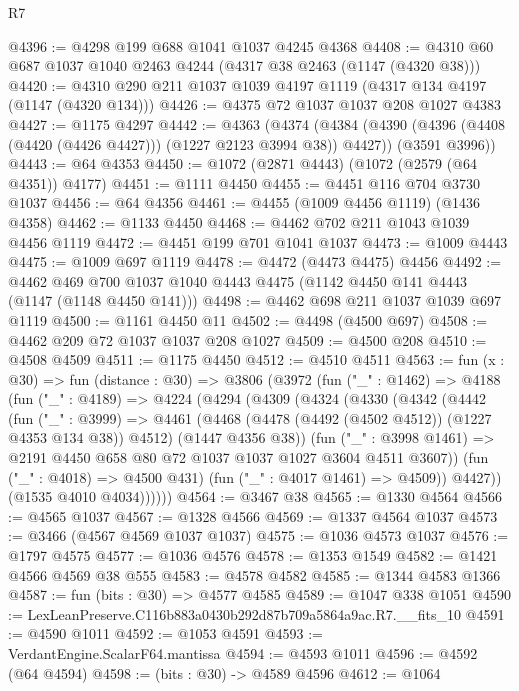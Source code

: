 \begin{lexlean}{R7}
\begin{coremodule}
@4396 := @4298 @199 @688 @1041 @1037 @4245 @4368
@4408 := @4310 @60 @687 @1037 @1040 @2463 @4244 (@4317 @38 @2463 (@1147 (@4320 @38)))
@4420 := @4310 @290 @211 @1037 @1039 @4197 @1119 (@4317 @134 @4197 (@1147 (@4320 @134)))
@4426 := @4375 @72 @1037 @1037 @208 @1027 @4383
@4427 := @1175 @4297
@4442 := @4363
    (@4374
      (@4384 (@4390 (@4396 (@4408 (@4420 (@4426 @4427))) (@1227 @2123 @3994 @38)) @4427))
      (@3591 @3996))
@4443 := @64 @4353
@4450 := @1072 (@2871 @4443) (@1072 (@2579 (@64 @4351)) @4177)
@4451 := @1111 @4450
@4455 := @4451 @116 @704 @3730 @1037
@4456 := @64 @4356
@4461 := @4455 (@1009 @4456 @1119) (@1436 @4358)
@4462 := @1133 @4450
@4468 := @4462 @702 @211 @1043 @1039 @4456 @1119
@4472 := @4451 @199 @701 @1041 @1037
@4473 := @1009 @4443
@4475 := @1009 @697 @1119
@4478 := @4472 (@4473 @4475) @4456
@4492 := @4462 @469 @700 @1037 @1040 @4443 @4475 (@1142 @4450 @141 @4443 (@1147 (@1148 @4450 @141)))
@4498 := @4462 @698 @211 @1037 @1039 @697 @1119
@4500 := @1161 @4450 @11
@4502 := @4498 (@4500 @697)
@4508 := @4462 @209 @72 @1037 @1037 @208 @1027
@4509 := @4500 @208
@4510 := @4508 @4509
@4511 := @1175 @4450
@4512 := @4510 @4511
@4563 := fun (x : @30) =>
  fun (distance : @30) =>
  @3806
    (@3972
      (fun ("_" : @1462) =>
      @4188
        (fun ("_" : @4189) =>
        @4224
          (@4294
            (@4309
              (@4324
                (@4330
                  (@4342
                    (@4442
                      (fun ("_" : @3999) =>
                      @4461
                        (@4468 (@4478 (@4492 (@4502 @4512)) (@1227 @4353 @134 @38)) @4512)
                        (@1447 @4356 @38))
                      (fun ("_" : @3998 @1461) =>
                      @2191 @4450 @658 @80 @72 @1037 @1037 @1027 @3604 @4511 @3607))
                    (fun ("_" : @4018) => @4500 @431)
                    (fun ("_" : @4017 @1461) => @4509))
                  @4427))
              (@1535 @4010 @4034))))))
@4564 := @3467 @38
@4565 := @1330 @4564
@4566 := @4565 @1037
@4567 := @1328 @4566
@4569 := @1337 @4564 @1037
@4573 := @3466 (@4567 @4569 @1037 @1037)
@4575 := @1036 @4573 @1037
@4576 := @1797 @4575
@4577 := @1036 @4576
@4578 := @1353 @1549
@4582 := @1421 @4566 @4569 @38 @555
@4583 := @4578 @4582
@4585 := @1344 @4583 @1366
@4587 := fun (bits : @30) => @4577 @4585
@4589 := @1047 @338 @1051
@4590 := LexLeanPreserve.C116b883a0430b292d87b709a5864a9ac.R7.__fits_10
@4591 := @4590 @1011
@4592 := @1053 @4591
@4593 := VerdantEngine.ScalarF64.mantissa
@4594 := @4593 @1011
@4596 := @4592 (@64 @4594)
@4598 := (bits : @30) -> @4589 @4596
@4612 := @1064

\end{coremodule}
\end{lexlean}
